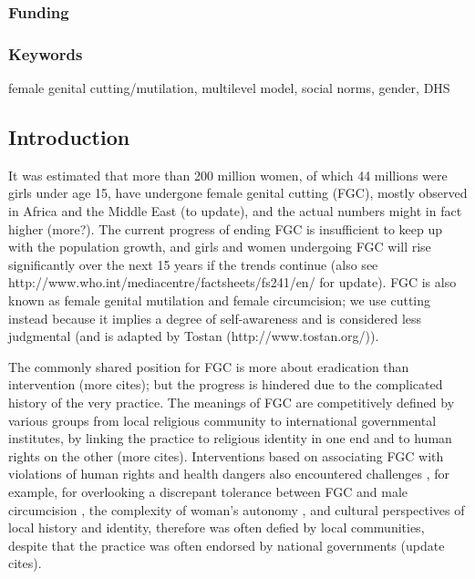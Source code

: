 \documentclass[12pt,]{article}
\begin{document}
\subsubsection{Funding}\label{funding}

\subsubsection{Keywords}\label{keywords}

female genital cutting/mutilation, multilevel model, social norms, gender, DHS

\subsection{Introduction}\label{introduction}

It was estimated that more than 200 million women, of which 44 millions were girls under age 15, have undergone female genital cutting (FGC), mostly observed in Africa and the Middle East \cite{UNFPA14, UNIC16} (to update), and the actual numbers might in fact higher \cite{GaluKama15} (more?).  The current progress of ending FGC is insufficient to keep up with the population growth, and girls and women undergoing FGC will rise significantly over the next 15 years if the trends continue \cite{UNIC16} (also see http://www.who.int/mediacentre/factsheets/fs241/en/ for update).  FGC is also known as female genital mutilation and female circumcision; we use cutting instead because it implies a degree of self-awareness and is considered less judgmental \cite{KhahBark09, JohnEsse10, Meye00, Shel01} (and is adapted by Tostan (http://www.tostan.org/)).

The commonly shared position for FGC is more about eradication than intervention \cite{Toub94, Mack96, UNIC16} (more cites); but the progress is hindered due to the complicated history of the very practice.  The meanings of FGC are competitively defined by various groups from local religious community to international governmental institutes, by linking the practice to religious identity in one end and to human rights on the other \cite{Boyl02, SchuLien13, WHO12} (more cites).  Interventions based on associating FGC with violations of human rights and health dangers also encountered challenges \cite{MuthSvan15}, for example, for overlooking a discrepant tolerance between FGC and male circumcision \cite{DarbSvob07, JohnEsse10}, the complexity of woman's autonomy \cite{Meye00}, and cultural perspectives of local history and identity, therefore was often defied by local communities, despite that the practice was often endorsed by national governments \cite{Boyl02, BoylMcMo02, BoylCarb10, Grue05, Koom14, PerrSeni13, Shel08, ShelWand13, Wade11} (update cites). 
\end{document}
